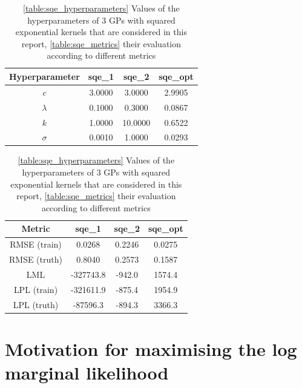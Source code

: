 \documentclass{article}
\begin{document}
\begin{table}[ht]
    \centering
    \begin{subtable}[t]{0.45\textwidth}
        \centering
        \begin{tabular}[t]{|c|c|c|c|}
            \hline
            Hyperparameter & sqe\_1 & sqe\_2 & sqe\_opt \\
            \hline
            $c$ & 3.0000 & 3.0000 & 2.9905 \\
            $\lambda$ & 0.1000 & 0.3000 & 0.0867 \\
            $k$ & 1.0000 & 10.0000 & 0.6522 \\
            $\sigma$ & 0.0010 & 1.0000 & 0.0293 \\
            \hline
        \end{tabular}
        \caption{}
        \label{table:sqe_hyperparameters}
    \end{subtable}
    \begin{subtable}[t]{0.45\textwidth}
        \centering
        \begin{tabular}[t]{|c|c|c|c|}
            \hline
            Metric & sqe\_1 & sqe\_2 & sqe\_opt \\
            \hline
            RMSE (train) & 0.0268 & 0.2246 & 0.0275 \\
            RMSE (truth) & 0.8040 & 0.2573 & 0.1587 \\
            LML & -327743.8 & -942.0 & 1574.4 \\
            LPL (train) & -321611.9 & -875.4 & 1954.9 \\
            LPL (truth) & -87596.3 & -894.3 & 3366.3 \\
            \hline
        \end{tabular}
        \caption{}
        \label{table:sqe_metrics}
    \end{subtable}
    \caption{\ref{table:sqe_hyperparameters} Values of the hyperparameters of 3 GPs with squared exponential kernels that are considered in this report, \ref{table:sqe_metrics} their evaluation according to different metrics}
    \label{table:sqe}
\end{table}

\section{Motivation for maximising the log marginal likelihood}\label{appendix:why_lml}




\end{document}
